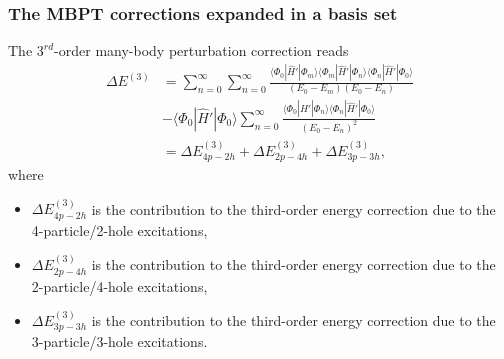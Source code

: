 \documentclass[xcolor=pdftex,hyperref={pdfpagelabels=false},table]{beamer}
\begin{document}
\begin{frame}
\frametitle{The MBPT corrections expanded in a basis set}
\begin{scriptsize}
The $3^{rd}$-order many-body perturbation correction reads
\begin{align}
\nonumber
\Delta E^{(3)} &= \sum_{n=0}^{\infty} \sum_{n=0}^{\infty}  \frac{  \langle \Phi_0 |\hat{H}'| \Phi_m  \rangle  \langle \Phi_m |\hat{H}'| \Phi_n  \rangle \langle \Phi_n |\hat{H}'| \Phi_0  \rangle }{(E_0 - E_m)(E_0 - E_n)} \\ \nonumber
&  - \langle \Phi_0 |\hat{H}'| \Phi_0  \rangle \sum_{n=0}^{\infty} \frac{ \langle \Phi_0 |\hat{H}'| \Phi_n  \rangle \langle \Phi_n |\hat{H}'| \Phi_0  \rangle }{(E_0 - E_n)^2}\\
&= \Delta E^{(3)}_{4p-2h} + \Delta E^{(3)}_{2p-4h} + \Delta E^{(3)}_{3p-3h},
\end{align}
where 
\begin{itemize}
 \item $\Delta E^{(3)}_{4p-2h}$ is the contribution to the third-order energy correction due to the 4-particle/2-hole excitations,
\item  $\Delta E^{(3)}_{2p-4h}$ is the contribution to the third-order energy correction due to the 2-particle/4-hole excitations,
\item  $\Delta E^{(3)}_{3p-3h}$ is the contribution to the third-order energy correction due to the 3-particle/3-hole excitations.
\end{itemize}
\end{scriptsize}
\end{frame}
\end{document}
